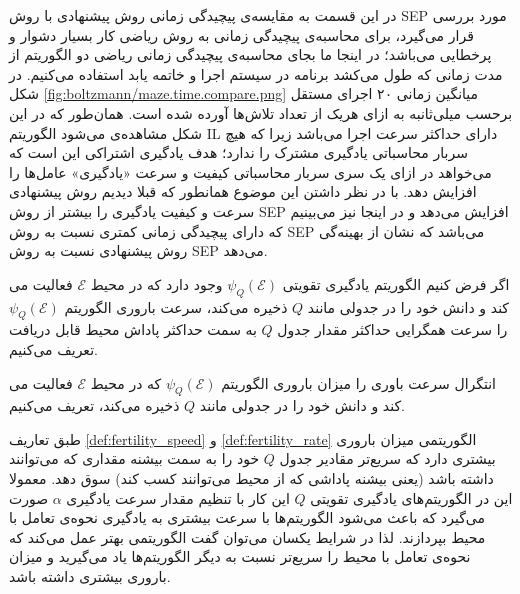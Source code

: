  در این قسمت به مقایسه‌‌ی پیچیدگی زمانی روش پیشنهادی با روش SEP مورد بررسی قرار می‌گیرد، برای محاسبه‌ی پیچیدگی زمانی به روش ریاضی کار بسیار دشوار و پرخطایی می‌باشد؛ در اینجا ما بجای محاسبه‌ی پیچیدگی زمانی ریاضی دو الگوریتم از مدت زمانی که طول می‌کشد برنامه در سیستم اجرا و خاتمه یابد استفاده می‌کنیم. در شکل
\ref{fig:boltzmann/maze.time.compare.png}
میانگین زمانی ۲۰ اجرای مستقل برحسب میلی‌ثانبه به ازای هریک از تعداد تلاش‌ها آورده شده است. همان‌طور که در این شکل مشاهده‌ی می‌شود الگوریتم IL دارای حداکثر سرعت اجرا می‌باشد زیرا که هیچ سربار محاسباتی یادگیری مشترک را ندارد؛ هدف یادگیری اشتراکی این است که می‌خواهد در ازای یک سری سربار محاسباتی کیفیت و سرعت «یادگیری» عامل‌ها را افزایش دهد. با در نظر داشتن این موضوع همانطور که قبلا دیدیم روش پیشنهادی سرعت و کیفیت یادگیری را بیشتر از روش SEP افزایش می‌دهد و در اینجا نیز می‌بینیم که دارای پیچیدگی زمانی کمتری نسبت به روش SEP می‌باشد که نشان از بهینه‌گی روش پیشنهادی نسبت به روش SEP می‌دهد.


\begin{definition}\setstretch{\thebaselinestretch}\label{def:fertility_speed}
اگر فرض کنیم الگوریتم یادگیری تقویتی $\psi_Q(\mathcal{E})$ وجود دارد که در محیط $\mathcal{E}$ فعالیت می کند و دانش خود را در جدولی مانند $Q$ ذخیره می‌کند، سرعت باروری الگوریتم $\psi_Q(\mathcal{E})$ را سرعت همگرایی حداکثر مقدار جدول $Q$ به سمت حداکثر پاداش محیط قابل دریافت تعریف می‌کنیم.
\end{definition}
\begin{definition}\setstretch{\thebaselinestretch}\label{def:fertility_rate}
انتگرال سرعت باوری را میزان باروری الگوریتم $\psi_Q(\mathcal{E})$ که در محیط $\mathcal{E}$ فعالیت می کند و دانش خود را در جدولی مانند $Q$ ذخیره می‌کند، تعریف می‌کنیم.
\end{definition}

\begin{hypo}\setstretch{\thebaselinestretch}\label{theorem:learning_speed}
طبق تعاریف \ref{def:fertility_speed} و \ref{def:fertility_rate} الگوریتمی میزان باروری بیشتری دارد که سریع‌تر مقادیر جدول $Q$ خود را به سمت بیشنه مقداری که می‌توانند داشته باشد (یعنی بیشنه پاداشی که از محیط می‌توانند کسب کند) سوق دهد. معمولا این در الگوریتم‌های یادگیری تقویتی $Q$ این کار با تنظیم مقدار سرعت یادگیری $\alpha$ صورت می‌گیرد که باعث می‌شود الگوریتم‌ها با سرعت بیشتری به یادگیری نحوه‌ی تعامل با محیط بپردازند. لذا در شرایط یکسان می‌توان گفت الگوریتمی بهتر عمل می‌کند که نحوه‌ی تعامل با محیط را سریع‌تر نسبت به دیگر الگوریتم‌ها یاد می‌گیرید و میزان باروری بیشتری داشته باشد.
\end{hypo}

